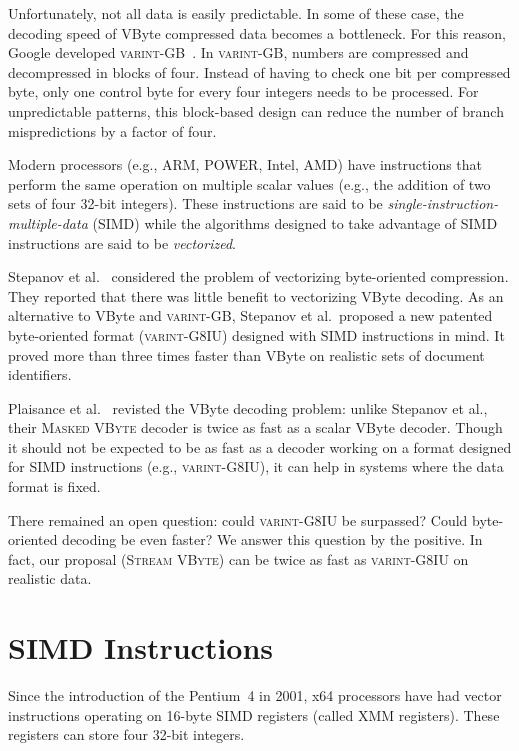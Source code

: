 \documentclass[compress]{elsarticle}
\newcommand{\vbyte}{VByte}
\newcommand{\maskedvbyte}{\textsc{Masked \vbyte{}}}
\newcommand{\varintgb}{\textsc{varint-GB}}
\newcommand{\streamvbyte}{\textsc{Stream \vbyte{}}}
\newcommand{\varintgiu}{\textsc{varint-G8IU}}
\begin{document}
 Unfortunately,
not all data is easily predictable.
In some of these case, the decoding speed of \vbyte{} compressed data becomes a bottleneck.
For this reason, Google developed \varintgb{}~\cite{DeanOfficialplusslides:2009:CBL:1498759.1498761}. In \varintgb{}, numbers are compressed and decompressed in blocks of four.
Instead of having to check one
bit per compressed byte, only one control byte for every four integers needs to be processed.
For unpredictable patterns, this block-based design can reduce the number of branch mispredictions by a factor of four.

Modern processors  (e.g., ARM, POWER, Intel, AMD) have instructions 
that perform the same operation on multiple scalar values  (e.g., the addition of two sets of four 32-bit integers).
These instructions are said to be  \emph{single-instruction-multiple-data} (SIMD) while the algorithms designed to take advantage of SIMD instructions are said to be \emph{vectorized}.

 Stepanov et al.~\cite{Stepanov:2011:SDP:2063576.2063627} considered the problem of vectorizing byte-oriented compression.
  They reported that there was little benefit to vectorizing VByte  decoding.  As an alternative to \vbyte{} and \varintgb{}, Stepanov et al.\ proposed a new patented
 byte-oriented format (\varintgiu{}) designed with SIMD instructions in mind. It proved more than three times faster than \vbyte{} on realistic sets of document identifiers.


Plaisance et al.~\cite{plaisance2015} revisted  the \vbyte{} decoding problem: unlike Stepanov et al., their  \maskedvbyte{} decoder is twice as fast as  a scalar \vbyte{}  decoder.
Though it  should not be expected to be as fast as a decoder working on a format designed for SIMD instructions (e.g., \varintgiu{}), it can
help in systems where the data format is fixed.

There remained an open question: could \varintgiu{} be surpassed?
Could byte-oriented decoding be even faster? We answer this question
by the positive. In fact, our proposal (\streamvbyte{}) can be twice as fast as \varintgiu{} on realistic data.



\section{SIMD Instructions}
\label{sec:simdinst}

Since the introduction of the Pentium~4 in 2001, x64 processors have had  vector instructions operating on 16-byte SIMD registers (called XMM registers). These
registers  can store four 32-bit integers.
\end{document}
